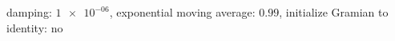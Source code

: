 damping: $\num[scientific-notation=true]{1e-06}$, exponential moving average: $\num[scientific-notation=true]{0.99}$, initialize Gramian to identity: $\text{no}$